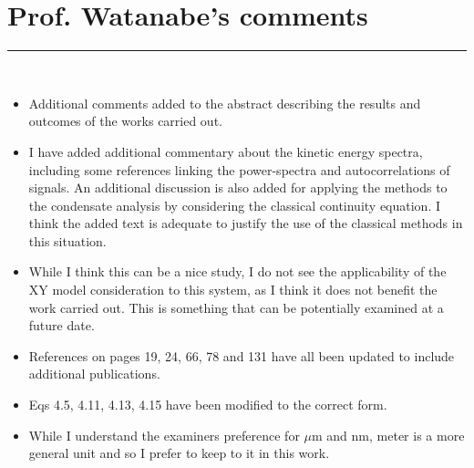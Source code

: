 \documentclass[paper=a4, fontsize=12pt]{scrartcl}
\begin{document}
\section{Prof. Watanabe's comments}
\rule{\textwidth}{1.5pt}\\[0.5cm]
\begin{itemize}
    \item Additional comments added to the abstract describing the results and outcomes of the works carried out.
    \item I have added additional commentary about the kinetic energy spectra, including some references linking the power-spectra and autocorrelations of signals. An additional discussion is also added for applying the methods to the condensate analysis by considering the classical continuity equation. I think the added text is adequate to justify the use of the classical methods in this situation.
    \item While I think this can be a nice study, I do not see the applicability of the XY model consideration to this system, as I think it does not benefit the work carried out. This is something that can be potentially examined at a future date.
    \item References on pages 19, 24, 66, 78 and 131 have all been updated to include additional publications.
    \item Eqs 4.5, 4.11, 4.13, 4.15 have been modified to the correct form.
    \item While I understand the examiners preference for $\mu$m and nm, meter is a more general unit and so I prefer to keep to it in this work.
\end{itemize}
\end{document}
